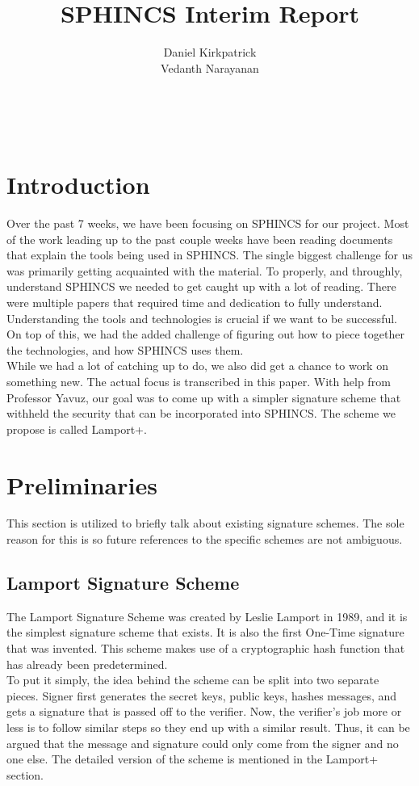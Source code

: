 \documentclass[]{scrartcl}
\title{SPHINCS Interim Report}
\author{Daniel Kirkpatrick\\Vedanth Narayanan}
\makeatletter
\renewcommand{\maketitle}{ %
	\begin{center} %
		{\LARGE\@title} %
		
		\vspace{15pt} %
		{\large\@author} %
		\\\@date %
		
	\end{center}
}
\makeatother
\begin{document}
\maketitle


\section*{Introduction}
Over the past 7 weeks, we have been focusing on SPHINCS for our project. Most of the work leading up to the past couple weeks have been reading documents that explain the tools being used in SPHINCS. The single biggest challenge for us was primarily getting acquainted with the material. To properly, and throughly, understand SPHINCS we needed to get caught up with a lot of reading. There were multiple papers that required time and dedication to fully understand. Understanding the tools and technologies is crucial if we want to be successful. On top of this, we had the added challenge of figuring out how to piece together the technologies, and how SPHINCS uses them.\\
While we had a lot of catching up to do, we also did get a chance to work on something new. The actual focus is transcribed in this paper. With help from Professor Yavuz, our goal was to come up with a simpler signature scheme that withheld the security that can be incorporated into SPHINCS. The scheme we propose is called Lamport+.

\section*{Preliminaries}
\vspace{-0.3cm}This section is utilized to briefly talk about existing signature schemes. The sole reason for this is so future references to the specific schemes are not ambiguous. 

\subsection*{Lamport Signature Scheme}
The Lamport Signature Scheme was created by Leslie Lamport in 1989, and it is the simplest signature scheme that exists. It is also the first One-Time signature that was invented. This scheme makes use of a cryptographic hash function that has already been predetermined.\\
To put it simply, the idea behind the scheme can be split into two separate pieces. Signer first generates the secret keys, public keys, hashes messages, and gets a signature that is passed off to the verifier. Now, the verifier's job more or less is to follow similar steps so they end up with a similar result. Thus, it can be argued that the message and signature could only come from the signer and no one else. The detailed version of the scheme is mentioned in the Lamport+ section.
\end{document}
